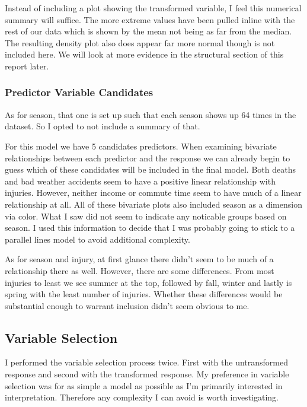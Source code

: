 

Instead of including a plot showing the transformed variable, I feel this numerical summary will suffice. The more extreme values have been pulled inline with the rest of our data which is shown by the mean not being as far from the median. The resulting density plot also does appear far more normal though is not included here. We will look at more evidence in the structural section of this report later. 

\subsubsection*{Predictor Variable Candidates}



As for season, that one is set up such that each season shows up 64 times in the dataset. So I opted to not include a summary of that.

For this model we have 5 candidates predictors. When examining bivariate relationships between each predictor and the response we can already begin to guess which of these candidates will be included in the final model. Both deaths and bad weather accidents seem to have a positive linear relationship with injuries. However, neither income or commute time seem to have much of a linear relationship at all. All of these bivariate plots also included season as a dimension via color. What I saw did not seem to indicate any noticable groups based on season. I used this information to decide that I was probably going to stick to a parallel lines model to avoid additional complexity. 

As for season and injury, at first glance there didn't seem to be much of a relationship there as well. However, there are some differences. From most injuries to least we see summer at the top, followed by fall, winter and lastly is spring with the least number of injuries. Whether these differences would be substantial enough to warrant inclusion didn't seem obvious to me. 

\subsection*{Variable Selection}

I performed the variable selection process twice. First with the untransformed response and second with the transformed response. My preference in variable selection was for as simple a model as possible as I'm primarily interested in interpretation. Therefore any complexity I can avoid is worth investigating.

